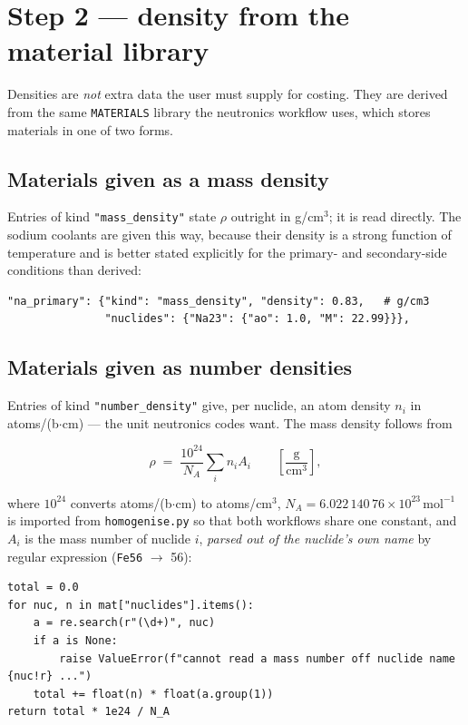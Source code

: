 \documentclass[9pt,a4paper]{extarticle}
\newcommand{\code}[1]{\texttt{\small #1}}
\newcommand{\file}[1]{\texttt{\small #1}}
\begin{document}
\section{Step 2 --- density from the material library}

Densities are \emph{not} extra data the user must supply for costing. They are
derived from the same \code{MATERIALS} library the neutronics workflow uses,
which stores materials in one of two forms.

\subsection{Materials given as a mass density}

Entries of kind \code{"mass\_density"} state $\rho$ outright in g/cm$^3$; it is
read directly. The sodium coolants are given this way, because their density is
a strong function of temperature and is better stated explicitly for the
primary- and secondary-side conditions than derived:

\begin{lstlisting}[style=py]
"na_primary": {"kind": "mass_density", "density": 0.83,   # g/cm3
               "nuclides": {"Na23": {"ao": 1.0, "M": 22.99}}},
\end{lstlisting}

\subsection{Materials given as number densities}
\label{sec:numdens}

Entries of kind \code{"number\_density"} give, per nuclide, an atom density
$n_i$ in atoms/(b$\cdot$cm) --- the unit neutronics codes want. The mass density
follows from

\begin{equation}
  \rho \;=\; \frac{10^{24}}{N_A}\sum_i n_i A_i
  \qquad
  \left[\frac{\text{g}}{\text{cm}^3}\right],
  \label{eq:rho}
\end{equation}

where $10^{24}$ converts atoms/(b$\cdot$cm) to atoms/cm$^3$, $N_A =
6.022\,140\,76\times10^{23}\,\text{mol}^{-1}$ is imported from
\file{homogenise.py} so that both workflows share one constant, and $A_i$ is the
mass number of nuclide $i$, \emph{parsed out of the nuclide's own name} by
regular expression (\code{Fe56} $\rightarrow$ 56):

\begin{lstlisting}[style=py]
total = 0.0
for nuc, n in mat["nuclides"].items():
    a = re.search(r"(\d+)", nuc)
    if a is None:
        raise ValueError(f"cannot read a mass number off nuclide name {nuc!r} ...")
    total += float(n) * float(a.group(1))
return total * 1e24 / N_A
\end{lstlisting}
\end{document}
